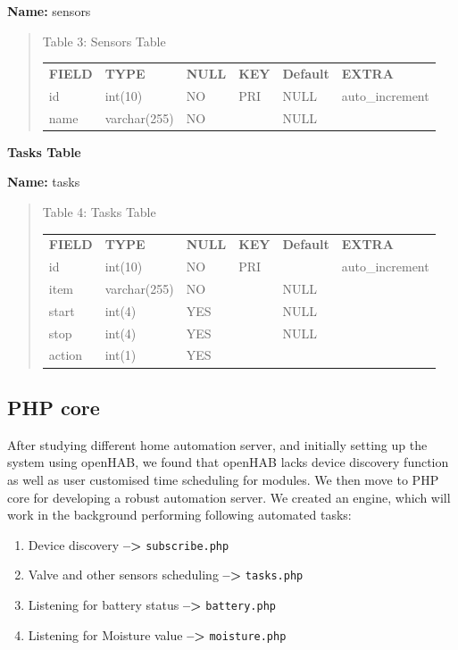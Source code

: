 \documentclass[16pt]{article}
\begin{document}
\textbf{Name:} sensors

\begin{quote}
	\centering
	\caption{Table 3: Sensors Table}
	\label{my-label}
	\begin{tabular}{llllll}
		{\bf FIELD} & {\bf TYPE}   & {\bf NULL} & {\bf KEY} & {\bf Default} & {\bf EXTRA}     \\
		id          & int(10)      & NO         & PRI       & NULL          & auto\_increment \\
		name        & varchar(255) & NO         &           & NULL          &                
	\end{tabular}

\end{quote}
\textbf{Tasks Table}

\textbf{Name:} tasks
\begin{quote}
\centering
\caption{Table 4: Tasks Table}
\label{my-label}
\begin{tabular}{llllll}
	{\bf FIELD} & {\bf TYPE}   & {\bf NULL} & {\bf KEY} & {\bf Default} & {\bf EXTRA}     \\
	id          & int(10)      & NO         & PRI       &           & auto\_increment \\
	item        & varchar(255) & NO         &           & NULL          &                 \\
	start       & int(4)       & YES        &           & NULL          &                 \\
	stop        & int(4)       & YES        &           & NULL          &                 \\
	action      & int(1)       & YES        &           &               &                
\end{tabular}
\end{quote}






\subsection{PHP core}
After studying different home automation server, and initially setting up the system using openHAB, we found that openHAB lacks device discovery function as well as user customised time scheduling for modules. We then move to PHP core for developing a robust automation server. We created an engine, which will work in the background performing
following automated tasks:

\begin{enumerate}

\item Device discovery \textbf{--\textgreater{}}
\texttt{subscribe.php}
\item Valve and other sensors scheduling
\textbf{--\textgreater{}} \texttt{tasks.php} 
\item Listening for battery status \textbf{--\textgreater{}} \texttt{battery.php} 
\item Listening for Moisture value \textbf{--\textgreater{}} \texttt{moisture.php}

\end{enumerate}
\end{document}
